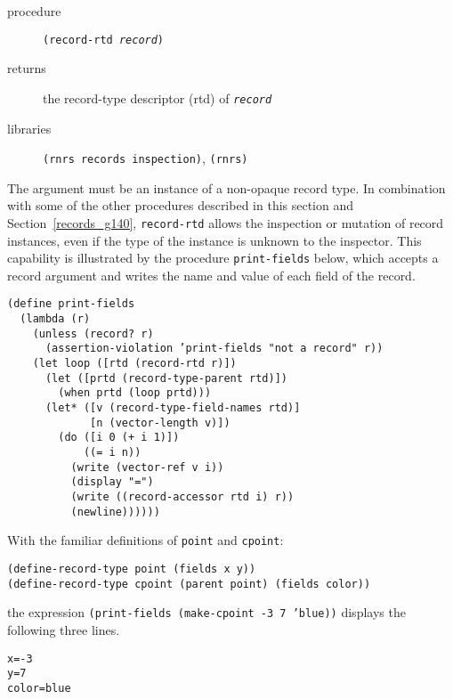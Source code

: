 \begin{description}

\label{records_s41}\item[procedure] \texttt{(record-rtd \textit{record})}



\item[returns] the record-type descriptor (rtd) of \texttt{\textit{record}}


\item[libraries] \texttt{(rnrs records inspection)}, \texttt{(rnrs)}
\end{description}


The argument must be an instance of a non-opaque record type.
In combination with some of the other procedures described in this
section and Section \ref{records_g140},
\texttt{record-rtd} allows the inspection or mutation
of record instances, even if the type of the instance is unknown
to the inspector.
This capability is illustrated by the procedure \texttt{print-fields}
below, which accepts a record argument and writes the name and value of
each field of the record.


\begin{alltt}
(define print-fields
  (lambda (r)
    (unless (record? r)
      (assertion-violation 'print-fields "not a record" r))
    (let loop ([rtd (record-rtd r)])
      (let ([prtd (record-type-parent rtd)])
        (when prtd (loop prtd)))
      (let* ([v (record-type-field-names rtd)]
             [n (vector-length v)])
        (do ([i 0 (+ i 1)])
            ((= i n))
          (write (vector-ref v i))
          (display "=")
          (write ((record-accessor rtd i) r))
          (newline))))))
\end{alltt}


With the familiar definitions of \texttt{point} and \texttt{cpoint}:


\begin{alltt}
(define-record-type point (fields x y))
(define-record-type cpoint (parent point) (fields color))
\end{alltt}


the expression \texttt{(print-fields (make-cpoint -3 7 'blue))} displays
the following three lines.


\begin{alltt}
x=-3
y=7
color=blue
\end{alltt}



